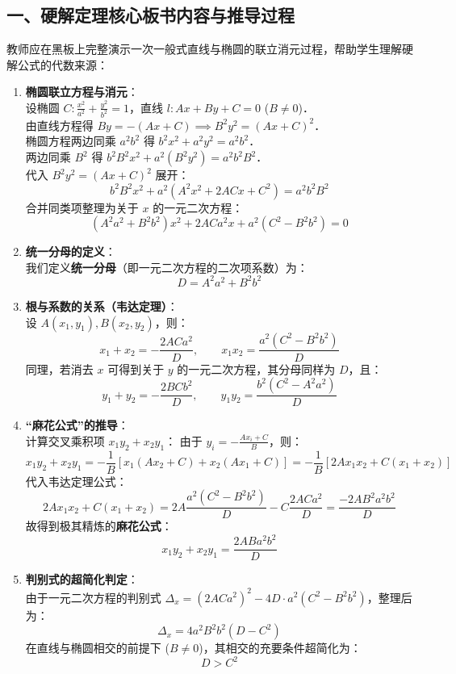 \documentclass[11pt,a4paper]{ctexart}
\begin{document}
\subsection*{一、硬解定理核心板书内容与推导过程}
教师应在黑板上完整演示一次一般式直线与椭圆的联立消元过程，帮助学生理解硬解公式的代数来源：
\begin{enumerate}
  \item \textbf{椭圆联立方程与消元}：\\
        设椭圆 $C: \frac{x^2}{a^2} + \frac{y^2}{b^2} = 1$，直线 $l: Ax + By + C = 0$ ($B \neq 0$)．\\
        由直线方程得 $By = -(Ax+C) \implies B^2y^2 = (Ax+C)^2$．\\
        椭圆方程两边同乘 $a^2b^2$ 得 $b^2x^2 + a^2y^2 = a^2b^2$．\\
        两边同乘 $B^2$ 得 $b^2B^2x^2 + a^2(B^2y^2) = a^2b^2B^2$．\\
        代入 $B^2y^2 = (Ax+C)^2$ 展开：
        \[ b^2B^2x^2 + a^2(A^2x^2 + 2ACx + C^2) = a^2b^2B^2 \]
        合并同类项整理为关于 $x$ 的一元二次方程：
        \[ (A^2a^2 + B^2b^2)x^2 + 2ACa^2x + a^2(C^2 - B^2b^2) = 0 \]
  \item \textbf{统一分母的定义}：\\
        我们定义\textbf{统一分母}（即一元二次方程的二次项系数）为：
        \[ D = A^2a^2 + B^2b^2 \]
  \item \textbf{根与系数的关系（韦达定理）}：\\
        设 $A(x_1, y_1), B(x_2, y_2)$，则：
        \[ x_1 + x_2 = -\frac{2ACa^2}{D},\qquad x_1x_2 = \frac{a^2(C^2 - B^2b^2)}{D} \]
        同理，若消去 $x$ 可得到关于 $y$ 的一元二次方程，其分母同样为 $D$，且：
        \[ y_1 + y_2 = -\frac{2BCb^2}{D},\qquad y_1y_2 = \frac{b^2(C^2 - A^2a^2)}{D} \]
  \item \textbf{“麻花公式”的推导}：\\
        计算交叉乘积项 $x_1y_2 + x_2y_1$：
        由于 $y_i = -\frac{Ax_i+C}{B}$，则：
        \[ x_1y_2 + x_2y_1 = -\frac{1}{B}\left[ x_1(Ax_2+C) + x_2(Ax_1+C) \right] = -\frac{1}{B}\left[ 2Ax_1x_2 + C(x_1+x_2) \right] \]
        代入韦达定理公式：
        \[ 2Ax_1x_2 + C(x_1+x_2) = 2A\frac{a^2(C^2-B^2b^2)}{D} - C\frac{2ACa^2}{D} = \frac{-2AB^2a^2b^2}{D} \]
        故得到极其精炼的\textbf{麻花公式}：
        \[ x_1y_2 + x_2y_1 = \frac{2ABa^2b^2}{D} \]
  \item \textbf{判别式的超简化判定}：\\
        由于一元二次方程的判别式 $\Delta_x = (2ACa^2)^2 - 4D \cdot a^2(C^2 - B^2b^2)$，整理后为：
        \[ \Delta_x = 4a^2B^2b^2(D - C^2) \]
        在直线与椭圆相交的前提下 ($B \neq 0$)，其相交的充要条件超简化为：
        \[ D > C^2 \]
\end{enumerate}
\end{document}
